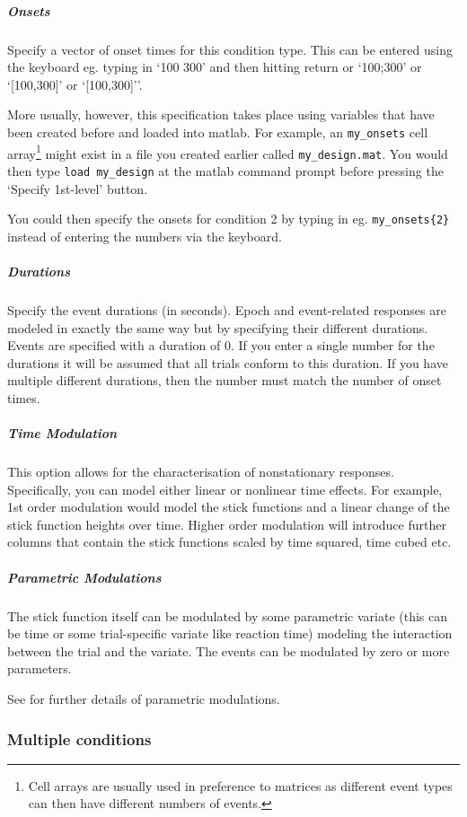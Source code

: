 \subparagraph{Onsets}

Specify a vector of onset times for this condition type. This can be entered using the keyboard eg. typing in `100 300' and then hitting return or `100;300' or `[100,300]' or `[100,300]''.

More usually, however, this specification takes place using variables that have been created before and loaded into matlab. For example, an \verb!my_onsets! cell array\footnote{Cell arrays are usually used in preference to matrices as different event types can then have different numbers of events.} might exist in a file you created earlier called \verb!my_design.mat!. You would then type \verb!load my_design! at the matlab command prompt before pressing the `Specify 1st-level' button. 

You could then specify the onsets for condition 2 by typing in eg. \verb!my_onsets{2}! instead of entering the numbers via the keyboard.


\subparagraph{Durations}

Specify the event durations (in seconds). Epoch and event-related responses are modeled in exactly the same way but by specifying their different durations.  Events are specified with a duration of 0.  If you enter a single number for the durations it will be assumed that all trials conform to this duration. If you have multiple different durations, then the number must match the number of onset times.

\subparagraph{Time Modulation}

This option allows for the characterisation of nonstationary responses.  Specifically, you can model either linear or nonlinear time effects. For example, 1st order modulation would model the stick functions and a linear change of the stick function heights over time. Higher order modulation will introduce further columns that contain the stick functions scaled by time squared, time cubed etc.

\subparagraph{Parametric Modulations}

The stick function itself can be modulated by some parametric variate (this can be time or some trial-specific variate like reaction time) modeling the interaction between the trial and the variate. The events can be modulated by zero or more parameters.

See \cite{parametric_pet,parametric_fmri} for further details of parametric modulations.

\subsubsection{Multiple conditions}

